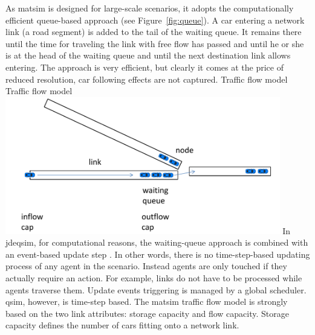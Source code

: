 As \gls{matsim} is designed for large-scale \glspl{scenario}, it adopts the computationally efficient queue-based approach (see Figure~\ref{fig:queue}). A car entering a network link (\ie a road segment) is added to the tail of the waiting queue. It remains there until the time for traveling the link with free flow has passed and until he or she is at the head of the waiting queue and until the next destination link allows entering. The approach is very efficient, but clearly it comes at the price of reduced resolution, \ie car following effects are not captured.   
%
\createfigure%
{Traffic flow model}%
{Traffic flow model}%
{\label{fig:queue}}%
{\includegraphics[width=0.9\textwidth, angle=0]{using/figures/queue.pdf}}%
{}
%
In \gls{jdeqsim}, for computational reasons, the waiting-queue approach is combined with an event-based update step \citep[][]{CharyparEtAl_TRB_2009}. In other words, there is no time-step-based updating process of any agent in the scenario. Instead agents are only touched if they actually require an action. For example, links do not have to be processed while agents traverse them.
%
%
Update events triggering is managed by a global scheduler. \gls{qsim}, however, is time-step based. 
%
%
%
The \gls{matsim} traffic flow model is strongly based on the two link attributes: storage capacity and flow capacity. Storage capacity defines the number of cars fitting onto a network link.
%
%

